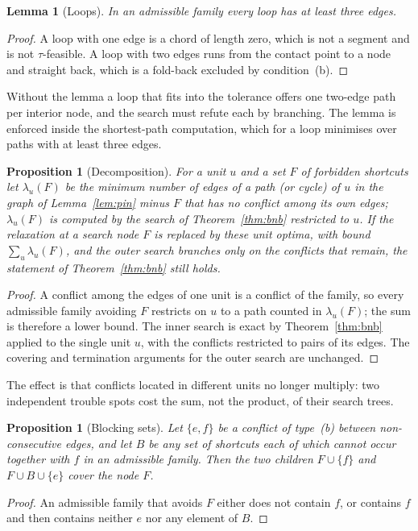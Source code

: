 \documentclass[11pt,a4paper]{article}
\newtheorem{lemma}[theorem]{Lemma}
\newtheorem{proposition}[theorem]{Proposition}
\theoremstyle{definition}
\theoremstyle{remark}
\begin{document}
\begin{lemma}[Loops]\label{lem:loop}
In an admissible family every loop has at least three edges.
\end{lemma}
\begin{proof}
A loop with one edge is a chord of length zero, which is not a segment and is
not $\tau$-feasible. A loop with two edges runs from the contact point to a
node and straight back, which is a fold-back excluded by condition~(b).
\end{proof}

Without the lemma a loop that fits into the tolerance offers one two-edge
path per interior node, and the search must refute each by branching. The
lemma is enforced inside the shortest-path computation, which for a loop
minimises over paths with at least three edges.

\begin{proposition}[Decomposition]\label{prop:units}
For a unit $u$ and a set $F$ of forbidden shortcuts let $\lambda_u(F)$ be the
minimum number of edges of a path (or cycle) of $u$ in the graph of
Lemma~\ref{lem:pin} minus $F$ that has no conflict among its own edges;
$\lambda_u(F)$ is computed by the search of Theorem~\ref{thm:bnb} restricted to
$u$. If the relaxation at a search node $F$ is replaced by these unit optima,
with bound $\sum_u\lambda_u(F)$, and the outer search branches only on the
conflicts that remain, the statement of Theorem~\ref{thm:bnb} still holds.
\end{proposition}
\begin{proof}
A conflict among the edges of one unit is a conflict of the family, so every
admissible family avoiding $F$ restricts on $u$ to a path counted in
$\lambda_u(F)$; the sum is therefore a lower bound. The inner search is exact
by Theorem~\ref{thm:bnb} applied to the single unit $u$, with the conflicts
restricted to pairs of its edges. The covering and termination arguments for
the outer search are unchanged.
\end{proof}

The effect is that conflicts located in different units no longer multiply:
two independent trouble spots cost the sum, not the product, of their search
trees.

\begin{proposition}[Blocking sets]\label{prop:block}
Let $\{e,f\}$ be a conflict of type~(b) between non-consecutive edges, and let
$B$ be any set of shortcuts each of which cannot occur together with $f$ in an
admissible family. Then the two children $F\cup\{f\}$ and
$F\cup B\cup\{e\}$ cover the node $F$.
\end{proposition}
\begin{proof}
An admissible family that avoids $F$ either does not contain $f$, or contains
$f$ and then contains neither $e$ nor any element of $B$.
\end{proof}
\end{document}
